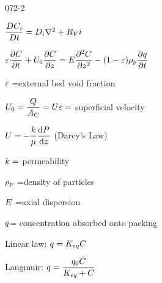 \begin{mitframe}{072-2}
	\begin{listone}
    	\item $\dfrac{\elecdisplace\conc_{\state}}{\elecdisplace{t}}=\pdiff\nabla^2+\specsource{i}$
        \item $\varepsilon\dfrac{\partial\conc}{\partial{t}}+\uvel_0\dfrac{\partial\conc}{\partial{z}}=\energy\dfrac{\partial^2\conc}{\partial{z}^2}-(1-\varepsilon)\dens_{p}\dfrac{\partial\heatflux}{\partial{t}}$
        \begin{listtwo}
        	\item $\varepsilon$ =external bed void fraction
            \item $\uvel_0=\dfrac{\heatflow}{\helmholtz_{\conc}}=\uvel\varepsilon=$
 superficial velocity
 			\begin{listthree}
            	\item $\uvel=-\dfrac{\thermcond}{\chempot}\dfrac{\mathrm{d}\p}{\mathrm{d}z}$ (Darcy's Law)
            	\begin{listfour}
            	\item $\thermcond=$ permeability
                \end{listfour}
            \end{listthree}
        \item $\dens_{p}$ =density of particles
        \item $\energy$ =axial dispersion
        \item $\heatflux$= concentration absorbed onto packing
        \begin{listthree}
        		\item Linear law: $\heatflux=\dilfac_{eq}\conc$
                \item Langmuir: $\heatflux=\dfrac{\heatflux_{0}\conc}{\dilfac_{eq}+\conc}$
        \end{listthree}
        \end{listtwo}
    \end{listone}        
\end{mitframe}
